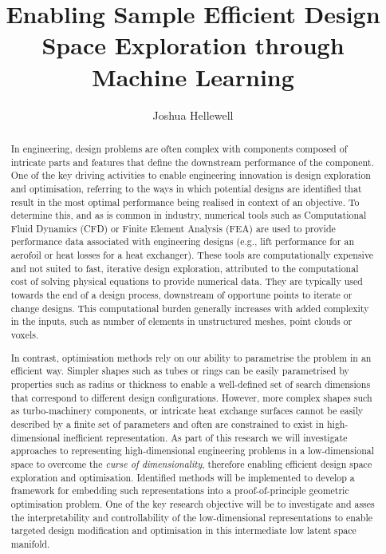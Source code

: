 \documentclass{article}
\title{Enabling Sample Efficient Design Space Exploration through Machine Learning}
\author{Joshua Hellewell}
\begin{document}
\maketitle

\newpage{}

\begin{abstract}
In engineering, design problems are often complex with components composed of intricate parts and features that define the downstream performance of the component. One of the key driving activities to enable engineering innovation is design exploration and optimisation, referring to the ways in which potential designs are identified that result in the most optimal performance being realised in context of an objective. To determine this, and as is common in industry, numerical tools such as Computational Fluid Dynamics (CFD) or Finite Element Analysis (FEA) are used to provide performance data associated with engineering designs (e.g., lift performance for an aerofoil or heat losses for a heat exchanger). These tools are computationally expensive and not suited to fast, iterative design exploration, attributed to the computational cost of solving physical equations to provide numerical data. They are typically used towards the end of a design process, downstream of opportune points to iterate or change designs. This computational burden generally increases with added complexity in the inputs, such as number of elements in unstructured meshes, point clouds or voxels.

In contrast, optimisation methods rely on our ability to parametrise the problem in an efficient way.  Simpler shapes such as tubes or rings can be easily parametrised by properties such as radius or thickness to enable a well-defined set of search dimensions that correspond to different design configurations. However, more complex shapes such as turbo-machinery components, or intricate heat exchange surfaces cannot be easily described by a finite set of parameters and often are constrained to exist in high-dimensional inefficient representation. As part of this research we will investigate approaches to representing high-dimensional engineering problems in a low-dimensional space to overcome the \textit{curse of dimensionality}, therefore enabling efficient design space exploration and optimisation. Identified methods will be implemented to develop a framework for embedding such representations into a proof-of-principle geometric optimisation problem. One of the key research objective will be to investigate and asses the interpretability and controllability of the low-dimensional representations to enable targeted design modification and optimisation in this intermediate low latent space manifold.
\end{abstract}
\end{document}
